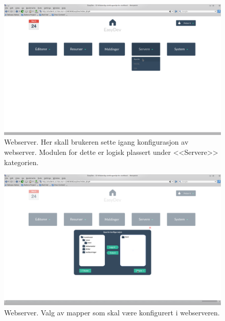 \begin{figure}[ht]
\includegraphics[width=\textwidth,height=\textheight,keepaspectratio]{./img/prosessdokumentasjon/hifi/a1.png}
\caption[Hi-fi Webserver 1]{Webserver. Her skall brukeren sette igang konfigurasjon av webserver. Modulen for dette er logisk plassert under <<Servere>> kategorien.}
\label{fig:apachehi1}
\end{figure}

\begin{figure}[ht]
\includegraphics[width=\textwidth,height=\textheight,keepaspectratio]{./img/prosessdokumentasjon/hifi/a2.png}
\caption[Hi-fi Webserver 2]{Webserver. Valg av mapper som skal være konfigurert i webserveren.}
\label{fig:apachehi2}
\end{figure}

